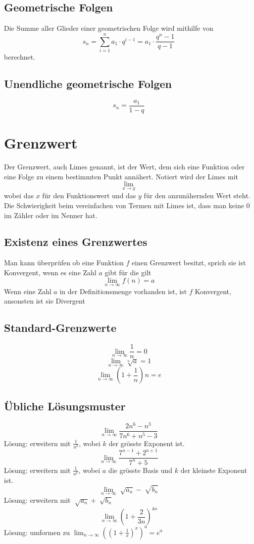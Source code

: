 \documentclass{article}
\begin{document}
\subsection{Geometrische Folgen}
Die Summe aller Glieder einer geometrischen Folge wird mithilfe von \[
		s_n = \sum_{i=1}^n a_1 \cdot q^{i-1} = a_1 \cdot \frac{q^n -1}{q-1} 
\] berechnet.

\subsection{Unendliche geometrische Folgen}
\[
s_n = \frac{a_1}{1-q} 
\]
\section{Grenzwert}
Der Grenzwert, auch Limes genannt, ist der Wert, dem sich eine Funktion oder eine Folge zu einem bestimmten Punkt annähert. Notiert wird der Limes mit $$ \lim_{x \to y}$$wobei das $x$ für den Funktionswert und das $y$ für den anzunähernden Wert steht. Die Schwierigkeit beim vereinfachen von Termen mit Limes ist, dass man keine 0 im Zähler oder im Nenner hat.
\subsection{Existenz eines Grenzwertes}
Man kann überprüfen ob eine Funktion $f$ einen Grenzwert besitzt, sprich sie ist Konvergent, wenn es eine Zahl $a$ gibt für die gilt
$$ \lim_{n \to \infty}f(n) = a$$
Wenn eine Zahl $a$ in der Definitionsmenge vorhanden ist, ist $f$ Konvergent, ansonsten ist sie Divergent
\subsection{Standard-Grenzwerte}
$$ \lim_{n \to \infty} \frac{1}{n} = 0$$
$$ \lim_{n \to \infty} \sqrt[n]{a} = 1$$
$$ \lim_{n \to \infty} \left(1+ \frac{1}{n} \right)^{}n = e$$
\subsection{Übliche Lösungsmuster}
$$ \lim_{n \to \infty} \frac{2n^{6}-n^{3}}{7n^{6}+n^{5}-3} $$Lösung: erweitern mit $ \frac{1}{n^{k}}$, wobei $k$ der grösste Exponent ist.
$$ \lim_{n \to \infty} \frac{7^{n-1}+2^{n+1}}{7^{n}+5}$$
Lösung: erweitern mit $ \frac{1}{a^{k}} $, wobei $a$ die grösste Basis und $k$ der kleinste Exponent ist.
$$ \lim_{n \to \infty} \sqrt[]{a_n} - \sqrt[]{b_n}$$ Lösung: erweitern mit $ \sqrt[]{a_n}+ \sqrt[]{b_n}$
$$ \lim_{n \to \infty} \left( 1+ \frac{2}{3n} \right)^{4n}$$
Lösung: umformen zu $ \lim_{n \to \infty} \left(\left(1+ \frac{1}{x}\right)^{x}\right)^{a} = e^{a}$
\end{document}
